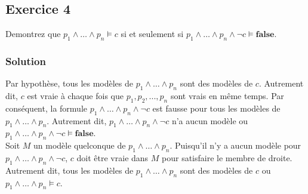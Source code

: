 \subsection*{Exercice 4}
Demontrez que $p_1 \wedge \ldots \wedge p_n \models c$ si et seulement si $p_1 \wedge \ldots \wedge p_n \wedge \neg c \models \textbf{false}$.

    \subsubsection*{Solution}

\noindent \fbox{$\implies$} Par hypothèse, tous les modèles de $p_1 \wedge \ldots \wedge p_n$ sont des modèles de $c$. Autrement dit, $c$ est vraie à chaque fois que  $p_1,p_2,...,p_n$ sont vrais en même temps. Par conséquent, la formule $p_1 \wedge \ldots \wedge p_n \wedge \neg c$ est fausse pour tous les modèles de $p_1 \wedge \ldots \wedge p_n$. Autrement dit, $p_1 \wedge \ldots \wedge p_n \wedge \neg c$ n'a aucun modèle ou $p_1 \wedge \ldots \wedge p_n \wedge \neg c \models \textbf{false}$. \\

\noindent \fbox{$\impliedby$} Soit $M$ un modèle quelconque de  $p_1 \wedge \ldots \wedge p_n$. Puisqu'il n'y a aucun modèle pour  $p_1 \wedge \ldots \wedge p_n \wedge \neg c$, $c$ doit être vraie dans $M$ pour satisfaire le membre de droite. Autrement dit, tous les modèles de $p_1 \wedge \ldots \wedge p_n$ sont des modèles de $c$ ou $p_1 \wedge \ldots \wedge p_n \models c$.
